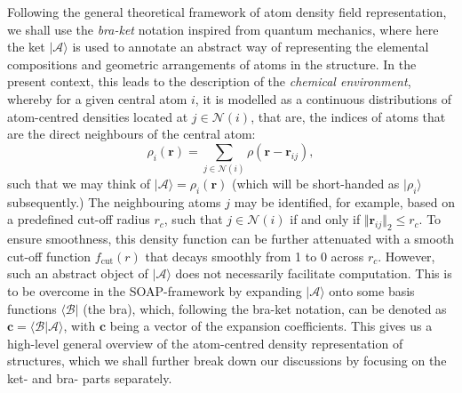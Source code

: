 Following the general theoretical framework of atom density field representation,\cite{willatt2019atom} we shall use the \emph{bra-ket} notation inspired from quantum mechanics, where here the ket $|\mathcal{A}\rangle$ is used to annotate an abstract way of representing the elemental compositions and geometric arrangements of atoms in the structure. In the present context, this leads to the description of the \emph{chemical environment}, whereby for a given central atom $i$, it is modelled as a continuous distributions of atom-centred densities located at $j\in\mathcal{N}(i)$, that are, the indices of atoms that are the direct neighbours of the central atom:
\begin{equation}
    \label{eq:atom_env_density_field}
    \rho_i(\bm{r})=\sum_{j\in\mathcal{N}(i)}\rho(\bm{r}-\bm{r}_{ij}),
\end{equation}
such that we may think of $|\mathcal{A}\rangle=\rho_i(\bm{r})$ (which will be short-handed as $|\rho_i\rangle$ subsequently.) The neighbouring atoms $j$ may be identified, for example, based on a predefined cut-off radius $r_c$,\cite{bartok2013representing,behler2011atom} such that $j\in\mathcal{N}(i)$ if and only if $\Vert\bm{r}_{ij}\Vert_2\leq r_c$.  To ensure smoothness, this density function can be further attenuated with a smooth cut-off function $f_{\mathrm{cut}}(r)$ that decays smoothly from 1 to 0 across $r_{c}$. However, such an abstract object of $|\mathcal{A}\rangle$ does not necessarily facilitate computation. This is to be overcome in the SOAP-framework by expanding $|\mathcal{A}\rangle$ onto some basis functions $\langle \mathcal{B}|$ (the bra), which, following the bra-ket notation, can be denoted as $\bm{c}=\langle\mathcal{B}|\mathcal{A}\rangle$, with $\bm{c}$ being a vector of the expansion coefficients. This gives us a high-level general overview of the atom-centred density representation of structures, which we shall further break down our discussions by focusing on the ket- and bra- parts separately.

